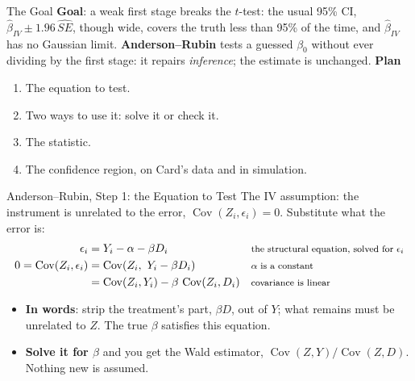 \documentclass[aspectratio=169,11pt,xcolor=dvipsnames]{beamer}
\DeclareMathOperator{\Cov}{Cov}
\begin{document}
\begin{frame}{The Goal}
\textbf{Goal}: a weak first stage breaks the $t$-test: the usual 95\% CI,
$\hat\beta_{IV} \pm 1.96\,\widehat{SE}$, though wide, covers the truth less than 95\% of the time, and $\hat\beta_{IV}$
has no Gaussian limit. \textbf{Anderson--Rubin}
tests a guessed $\beta_0$ without ever dividing by the first stage: it repairs
\emph{inference}; the estimate is unchanged.
\vskip4pt
\textbf{Plan}
\begin{enumerate}\itemsep2pt
  \item The equation to test.
  \item Two ways to use it: solve it or check it.
  \item The statistic.
  \item The confidence region, on Card's data and in simulation.
\end{enumerate}
\end{frame}

\begin{frame}{Anderson--Rubin, Step 1: the Equation to Test}
The IV assumption: the instrument is unrelated to the error, $\Cov(Z_i, \epsilon_i) = 0$.
Substitute what the error is:
\begin{align*}
  \epsilon_i &= Y_i - \alpha - \beta D_i
     && \text{\footnotesize the structural equation, solved for $\epsilon_i$} \\
  0 = \Cov(Z_i, \epsilon_i) &= \Cov(Z_i,\ Y_i - \beta D_i)
     && \text{\footnotesize $\alpha$ is a constant} \\
     &= \Cov(Z_i, Y_i) - \beta\,\Cov(Z_i, D_i)
     && \text{\footnotesize covariance is linear}
\end{align*}
\vskip4pt
\begin{itemize}\itemsep4pt
  \item \textbf{In words}: strip the treatment's part, $\beta D$, out of $Y$;
        what remains must be unrelated to $Z$. The true $\beta$ satisfies this
        equation.
  \item \textbf{Solve it for $\beta$} and you get the Wald estimator,
        $\Cov(Z,Y)/\Cov(Z,D)$. Nothing new is assumed.
\end{itemize}
\end{frame}
\end{document}
